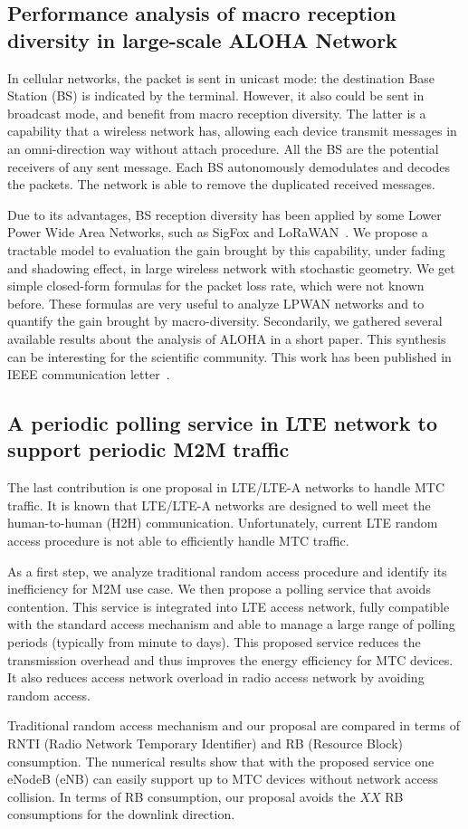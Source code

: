 \subsection{Performance analysis of macro reception diversity in large-scale ALOHA Network}
In cellular networks, the packet is sent in unicast mode: the destination Base Station (BS) is indicated by the terminal. However, it also could be sent in broadcast mode, and benefit from macro reception diversity. The latter is a capability that a wireless network has,  allowing each device transmit messages in an omni-direction way without attach procedure. All the BS are the potential receivers of any sent message. Each BS autonomously demodulates and decodes the packets. The network is able to remove the duplicated received messages. 

Due to its advantages, BS reception diversity has been applied by some Lower Power Wide Area Networks, such as SigFox and LoRaWAN~\cite{ietf-lpwan-overview-03}. We propose a tractable model to evaluation the gain brought by this capability, under fading and shadowing effect, in large wireless network with stochastic geometry. We get simple closed-form formulas for the packet loss rate, which were not known before. These formulas are very useful to analyze LPWAN networks and to quantify the gain brought by macro-diversity. Secondarily, we gathered several available results about the analysis of ALOHA in a short paper. This synthesis can be interesting for the scientific community. This work has been published in IEEE communication letter~\cite{song2017evaluation}.

\subsection{A periodic polling service in LTE network to support periodic M2M traffic}
The last contribution is one proposal in LTE/LTE-A networks to handle MTC traffic. It is known that LTE/LTE-A networks are designed to well meet the human-to-human (H2H) communication. Unfortunately, current LTE random access procedure is not able to efficiently handle MTC traffic. 

As a first step, we analyze traditional random access procedure and identify its inefficiency for M2M use case. We then propose a polling service that avoids contention. This service is integrated into LTE access network, fully compatible with the standard access mechanism and able to manage a large range of polling periods (typically from  minute to  days).
This proposed service reduces the transmission overhead and thus improves the energy efficiency for MTC devices. It also reduces access network overload in radio access network by avoiding random access. 

Traditional random access mechanism and our proposal are compared in terms of RNTI (Radio Network Temporary Identifier) and RB (Resource Block) consumption. The numerical results show that with the proposed service one eNodeB (eNB) can easily support up to  MTC devices without network access collision. In terms of RB consumption, our proposal avoids the $XX$ RB consumptions for the downlink direction. 